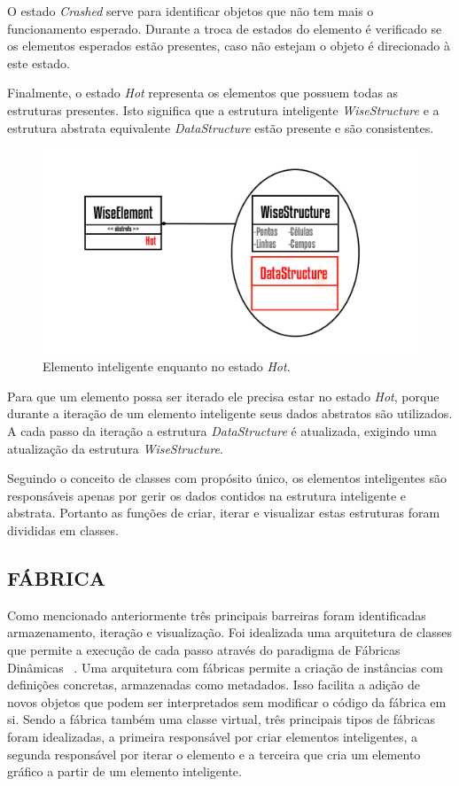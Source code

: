 \documentclass[a4paper,12pt]{monografia}
\theoremstyle{plain}
\theoremstyle{definition}
\theoremstyle{remark}
\begin{document}
O estado \textit{Crashed} serve para identificar objetos que não tem mais o funcionamento esperado. Durante a troca de estados do elemento é verificado se os elementos esperados estão presentes, caso não estejam o objeto é direcionado à este estado.

Finalmente, o estado \textit{Hot} representa os elementos que possuem todas as estruturas presentes. Isto significa que a estrutura inteligente \textit{WiseStructure} e a estrutura abstrata equivalente \textit{DataStructure} estão presente e são consistentes.

\begin{figure}[!htbp]
	\centering
	\includegraphics[scale=1]{Figures/WiseElementHot.png}
	\caption{Elemento inteligente enquanto no estado \textit{Hot}.}
	\label{fig6:wiseelementhot}
\end{figure}

Para que um elemento possa ser iterado ele precisa estar no estado \textit{Hot}, porque durante a iteração de um elemento inteligente seus dados abstratos são utilizados. A cada passo da iteração a estrutura \textit{DataStructure} é atualizada, exigindo uma atualização da estrutura \textit{WiseStructure}.

Seguindo o conceito de classes com propósito único, os elementos inteligentes são responsáveis apenas por gerir os dados contidos na estrutura inteligente e abstrata. Portanto as funções de criar, iterar e visualizar estas estruturas foram divididas em classes.

\subsection{FÁBRICA}\label{sec:fabrica} 
 
Como mencionado anteriormente três principais barreiras foram identificadas armazenamento, iteração e visualização. Foi idealizada uma arquitetura de classes que permite a execução de cada passo através do paradigma de Fábricas Dinâmicas~ \cite{factorypattern}. Uma arquitetura com fábricas permite a criação de instâncias com definições concretas, armazenadas como metadados. Isso facilita a adição de novos objetos que podem ser interpretados sem modificar o código da fábrica em si. Sendo a fábrica também uma classe virtual, três principais tipos de fábricas foram idealizadas, a primeira responsável por criar elementos inteligentes, a  segunda responsável por iterar o elemento e a terceira que cria um elemento gráfico a partir de um elemento inteligente.
\end{document}
